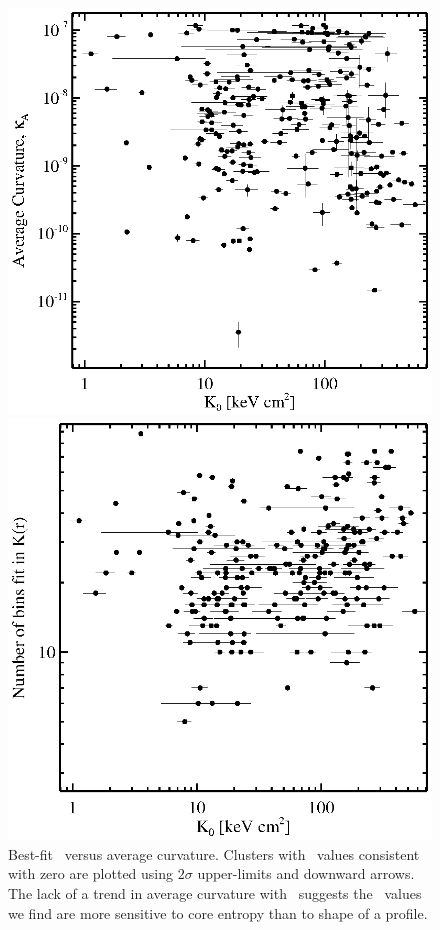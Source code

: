 \begin{figure}[!t]
  \begin{minipage}[t]{0.5\linewidth}
    \includegraphics*[width=\textwidth, trim=28mm 7mm 40mm 17mm, clip]{curvk0}
    \caption[Best-fit \kna\ versus average curvature,
      $\kappa_A$.]{Best-fit \kna\ versus average curvature. Clusters
      with \kna\ values consistent with zero are plotted using
      $2\sigma$ upper-limits and downward arrows. The lack of a trend
      in average curvature with \kna\ suggests the \kna\ values we
      find are more sensitive to core entropy than to shape of a
      profile.}
    \label{fig:curve}
  \end{minipage}
  \hspace{0.1in}
  \begin{minipage}[t]{0.5\linewidth}
    \includegraphics*[width=\textwidth, trim=28mm 7mm 40mm 17mm, clip]{nbins_k0}

\end{minipage}
\end{figure}
